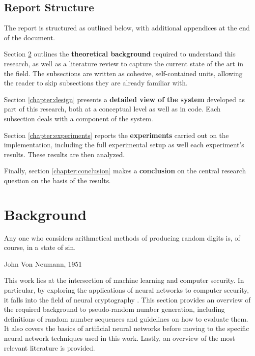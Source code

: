 \documentclass[12pt, titlepage]{report}
\theoremstyle{definition}
\begin{document}
\section{Report Structure}
The report is structured as outlined below, with additional appendices at the end of the document.

Section \ref{chapter:background} outlines the \textbf{theoretical background} required to understand this research, as well as a literature review to capture the current state of the art in the field. The subsections are written as cohesive, self-contained units, allowing the reader to skip subsections they are already familiar with.

Section \ref{chapter:design} presents a \textbf{detailed view of the system} developed as part of this research, both at a conceptual level as well as in code. Each subsection deals with a component of the system.

Section \ref{chapter:experiments} reports the \textbf{experiments} carried out on the implementation, including the full experimental setup as well each experiment's results. These results are then analyzed.

Finally, section \ref{chapter:conclusion} makes a \textbf{conclusion} on the central research question on the basis of the results.




\chapter{Background}\label{chapter:background}
\epigraph{Any one who considers arithmetical methods of producing random digits is, of course, in a state of sin.}{John Von Neumann, 1951}

This work lies at the intersection of machine learning and computer security. In particular, by exploring the applications of neural networks to computer security, it falls into the field of neural cryptography \cite{klimov2002analysis}. This section provides an overview of the required background to pseudo-random number generation, including definitions of random number sequences and guidelines on how to evaluate them. It also covers the basics of artificial neural networks before moving to the specific neural network techniques used in this work. Lastly, an overview of the most relevant literature is provided.
\end{document}
